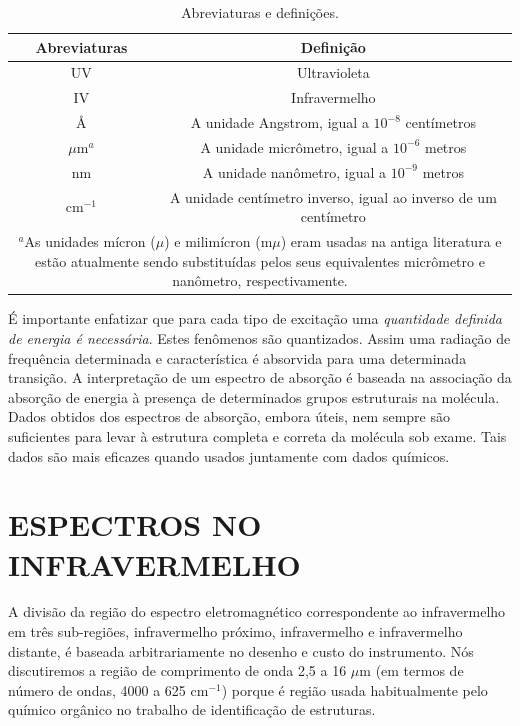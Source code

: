 \begin{table}[H]
\centering
\caption{Abreviaturas e definições.}
\label{tabela_9_2}
    \begin{tabular*}{0.8\textwidth}{cc}
        \toprule
        Abreviaturas & Definição \\
        \midrule
        UV & Ultravioleta \\
        IV & Infravermelho \\
        \AA & A unidade Angstrom, igual a $10^{-8}$ centímetros \\
        $\mu$m$^a$ & A unidade micrômetro, igual a $10^{-6}$ metros\\
        nm & A unidade nanômetro, igual a $10^{-9}$ metros \\
        cm$^{-1}$ & A unidade centímetro inverso, igual ao inverso de um centímetro \\
        \bottomrule
        \multicolumn{2}{p{0.78\textwidth}}{$^a$As unidades mícron ($\mu$) e milimícron (m$\mu$) eram usadas na antiga literatura e estão atualmente sendo substituídas pelos seus equivalentes micrômetro e nanômetro, respectivamente.}
    \end{tabular*}
\end{table}

\noindent É importante enfatizar que para cada tipo de excitação uma \textit{quantidade definida de energia é necessária}. Estes fenômenos são quantizados. Assim uma radiação de frequência determinada e característica é absorvida para uma determinada transição. A interpretação de um espectro de absorção é baseada na associação da absorção de energia à presença de determinados grupos estruturais na molécula. Dados obtidos dos espectros de absorção, embora úteis, nem sempre são suficientes para levar à estrutura completa e correta da molécula sob exame. Tais dados são mais eficazes quando usados juntamente com dados químicos.

\section{ESPECTROS NO INFRAVERMELHO}

A divisão da região do espectro eletromagnético correspondente ao infravermelho em três sub-regiões, infravermelho próximo, infravermelho e infravermelho distante, é baseada arbitrariamente no desenho e custo do instrumento. Nós discutiremos a região de comprimento de onda 2,5 a 16 $\mu$m (em termos de número de ondas, 4000 a 625 cm$^{-1}$) porque é região usada habitualmente pelo químico orgânico no trabalho de identificação de estruturas.

